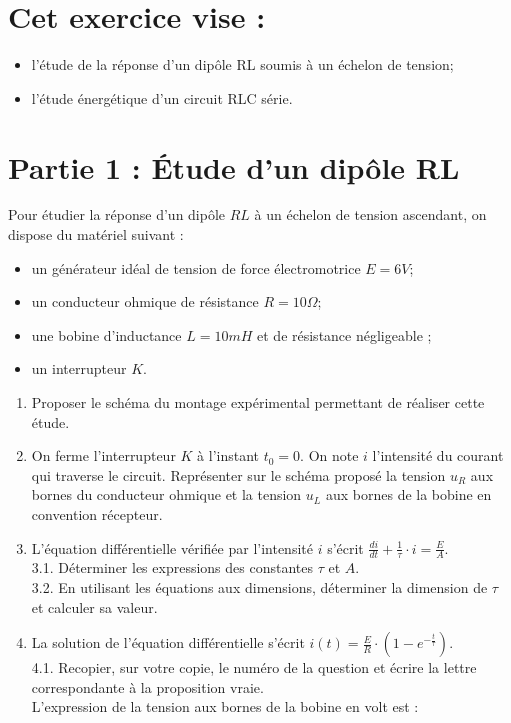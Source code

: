 \section*{Cet exercice vise :}
\begin{itemize}
  \item l'étude de la réponse d'un dipôle RL soumis à un échelon de tension;
  \item l'étude énergétique d'un circuit RLC série.
\end{itemize}

\section*{Partie 1 : Étude d'un dipôle RL}
Pour étudier la réponse d'un dipôle $R L$ à un échelon de tension ascendant, on dispose du matériel suivant :

\begin{itemize}
  \item un générateur idéal de tension de force électromotrice $E=6 V$;
  \item un conducteur ohmique de résistance $R=10 \Omega$;
  \item une bobine d'inductance $L=10 m H$ et de résistance négligeable ;
  \item un interrupteur $K$.
\end{itemize}

\begin{enumerate}
  \item Proposer le schéma du montage expérimental permettant de réaliser cette étude.
  \item On ferme l'interrupteur $K$ à l'instant $t_{0}=0$. On note $i$ l'intensité du courant qui traverse le circuit. Représenter sur le schéma proposé la tension $u_{R}$ aux bornes du conducteur ohmique et la tension $u_{L}$ aux bornes de la bobine en convention récepteur.
  \item L'équation différentielle vérifiée par l'intensité $i$ s'écrit $\frac{d i}{d t}+\frac{1}{\tau} \cdot i=\frac{E}{A}$.\\
3.1. Déterminer les expressions des constantes $\tau$ et $A$.\\
3.2. En utilisant les équations aux dimensions, déterminer la dimension de $\tau$ et calculer sa valeur.
  \item La solution de l'équation différentielle s'écrit $i(t)=\frac{E}{R} \cdot\left(1-e^{-\frac{t}{\tau}}\right)$.\\
4.1. Recopier, sur votre copie, le numéro de la question et écrire la lettre correspondante à la proposition vraie.\\
L'expression de la tension aux bornes de la bobine en volt est :
\end{enumerate}

